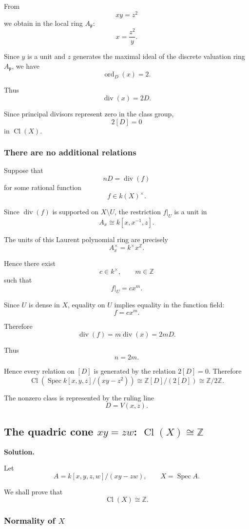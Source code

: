 \documentclass[12pt,a4paper]{article}
\DeclareMathOperator{\Spec}{Spec}
\newcommand{\divisor}{\operatorname{div}}
\newcommand{\Z}{\mathbb{Z}}
\newcommand{\Cl}{\operatorname{Cl}}
\providecommand{\Spec}{\operatorname{Spec}}
\theoremstyle{notespace}
\begin{document}
From
\[
xy=z^2
\]
we obtain in the local ring \(A_{\mathfrak p}\):
\[
x=\frac{z^2}{y}.
\]

Since \(y\) is a unit and \(z\) generates the maximal ideal of the discrete valuation ring \(A_{\mathfrak p}\), we have
\[
\operatorname{ord}_D(x)=2.
\]

Thus
\[
\divisor(x)=2D.
\]

Since principal divisors represent zero in the class group,
\[
2[D]=0
\]
in \(\Cl(X)\).

\subsubsection{There are no additional relations}

Suppose that
\[
nD=\divisor(f)
\]
for some rational function
\[
f\in k(X)^\times.
\]

Since \(\divisor(f)\) is supported on \(X\setminus U\), the restriction \(f|_U\) is a unit in
\[
A_x\cong k[x,x^{-1},z].
\]

The units of this Laurent polynomial ring are precisely
\[
A_x^\times=k^\times x^{\Z}.
\]

Hence there exist
\[
c\in k^\times,
\qquad
m\in \Z
\]
such that
\[
f|_U=cx^m.
\]

Since \(U\) is dense in \(X\), equality on \(U\) implies equality in the function field:
\[
f=cx^m.
\]

Therefore
\[
\divisor(f)
=
m\divisor(x)
=
2mD.
\]

Thus
\[
n=2m.
\]

Hence every relation on \([D]\) is generated by the relation \(2[D]=0\). Therefore
\[
\boxed{
	\Cl\!\left(\Spec k[x,y,z]/(xy-z^2)\right)
	\cong
	\Z[D]/(2[D])
	\cong
	\Z/2\Z.
}
\]

The nonzero class is represented by the ruling line
\[
D=V(x,z).
\]

\subsection{\texorpdfstring{The quadric cone \(xy=zw\): \(\Cl(X)\cong \Z\)}{The quadric cone xy=zw}}

\textbf{Solution.}

Let
\[
A=k[x,y,z,w]/(xy-zw),
\qquad
X=\Spec A.
\]

We shall prove that
\[
\Cl(X)\cong \Z.
\]

\subsubsection{Normality of \(X\)}
\end{document}
